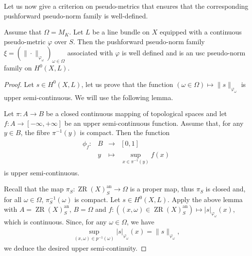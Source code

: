 \documentclass [11pt,reqno]{amsart}
\newcommand{\1}{\mathmybb{1}}
\def\an{\operatorname{an}}
\def\ZR{\operatorname{ZR}}
\newcommand{\fonction}[5]{\begin{array}{l|rcl}
#1: & #2 & \longrightarrow & #3 \\
    & #4 & \longmapsto & #5 \end{array}}
\begin{document}
Let us now give a criterion on pseudo-metrics that ensures that the corresponding pushforward pseudo-norm family is well-defined. 

\begin{proposition}
\label{prop:existence_pushforward_pseudo-norm_family}
Assume that $\Omega=M_{K}$. Let $L$ be a line bundle on $X$ equipped with a continuous pseudo-metric $\varphi$ over $S$. Then the pushforward pseudo-norm family $\xi=(\|\cdot\|_{\varphi_{\omega}})_{\omega\in \Omega}$ associated with $\varphi$ is well defined and is an usc pseudo-norm family on $H^{0}(X,L)$. 
\end{proposition}

\begin{proof}
Let $s\in H^{0}(X,L)$, let us prove that the function $(\omega\in\Omega) \mapsto \|s\|_{\varphi_{\omega}}$ is upper semi-continuous. We will use the following lemma.

\begin{lemma}
\label{lemma:pushforward_adelic_line_bundle}
Let $\pi : A \to B$ be a closed continuous mapping of topological spaces and let $f:A \to [-\infty,+\infty]$ be an upper semi-continuous function. Assume that, for any $y\in B$, the fibre $\pi^{-1}(y)$ is compact. Then the function 
\begin{align*}
\fonction{\phi_f}{B}{[0,1]}{y}{\displaystyle\sup_{x\in \pi^{-1}(y)}f(x)}
\end{align*}
is upper semi-continuous.
\end{lemma}

Recall that the map $\pi_{S}:\ZR(X)_{S}^{\an} \to \Omega$ is a proper map, thus $\pi_{S}$ is closed and, for all $\omega\in \Omega$, $\pi_{S}^{-1}(\omega)$ is compact. Let $s\in  H^{0}(X,L)$. Apply the above lemma with $A=\ZR(X)_{S}^{\an}$, $B=\Omega$ and $f:((x,\omega)\in \ZR(X)_{S}^{\an}) \mapsto |s|_{\varphi_{\omega}}(x)$, which is continuous. Since, for any $\omega\in\Omega$, we have 
\begin{align*}
\displaystyle\sup_{(x,\omega)\in p^{-1}(\omega)}|s|_{\varphi_{\omega}}(x) = \|s\|_{\varphi_{\omega}},
\end{align*}
we deduce the desired upper semi-continuity.


\end{proof}
\end{document}
